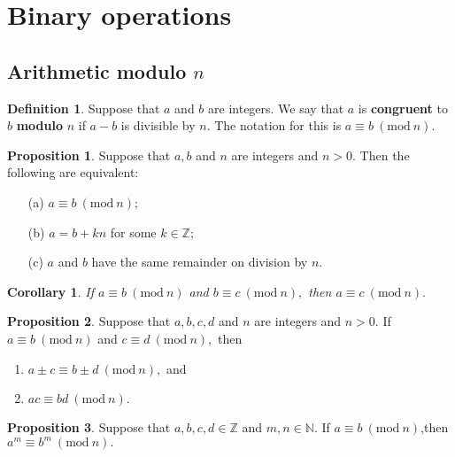 \documentclass[12pt, a4paper]{article}
\newcommand{\bb}[1]{\mathbb{#1}}
\newcommand{\Mod}[1]{\ (\mathrm{mod}\ #1)}
\theoremstyle{definition}
\newtheorem{definition}{Definition}[section]
\newtheorem{proposition}{Proposition}
\theoremstyle{plain}
\newtheorem{corollary}{Corollary}[theorem]
\begin{document}
\pagebreak

\section{Binary operations}

\subsection{Arithmetic modulo \texorpdfstring{$n$}{TEXT}}

\begin{definition}
Suppose that $a$ and $b$ are integers. We say that $a$ is \textbf{congruent} to $b$ \textbf{modulo} $n$ if $a - b$ is divisible by $n.$ The notation for this is $a \equiv b \Mod{n}.$
\end{definition}

\begin{proposition}
Suppose that $a, b$ and $n$ are integers and $n > 0.$ Then
the following are equivalent: 
\begin{enumerate}
	
	\item[(a)] $a \equiv b \Mod{n};$

	\item[(b)] $a=b+kn$ for some $k\in \bb{Z};$

	\item[(c)] $a$ and $b$ have the same remainder on division by $n$.

\end{enumerate}
\end{proposition}

\begin{corollary}
If $a \equiv b \Mod{n}$ and $b \equiv c \Mod{n},$ then $a \equiv c \Mod{n}.$
\end{corollary}

\begin{proposition}
Suppose that $a, b, c, d$ and $n$ are integers and $n > 0.$ If $a \equiv b \Mod{n}$ and $c \equiv d \Mod{n},$ then
\begin{enumerate}
	
	\item $a\pm c \equiv b\pm d \Mod{n},$ and 

	\item $ac \equiv bd \Mod{n}.$

\end{enumerate}
\end{proposition}

\begin{proposition}
Suppose that $a,b,c,d \in \bb{Z}$ and $m,n \in \bb{N}.$ If $a\equiv b \Mod{n}$,then $a^m \equiv b^m \Mod{n}.$
\end{proposition}
\end{document}
